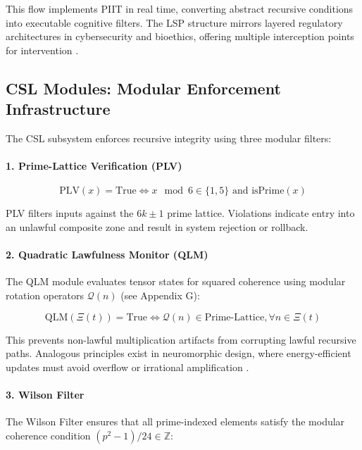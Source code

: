 \documentclass[12pt]{article}
\begin{document}
This flow implements PIIT in real time, converting abstract recursive conditions into executable cognitive filters. The LSP structure mirrors layered regulatory architectures in cybersecurity and bioethics, offering multiple interception points for intervention \cite{binns2018fairness}.

\subsection{CSL Modules: Modular Enforcement Infrastructure}

The CSL subsystem enforces recursive integrity using three modular filters:

\paragraph{1. Prime-Lattice Verification (PLV)}

\begin{equation}
\text{PLV}(x) = \text{True} \iff x \mod 6 \in \{1, 5\} \text{ and } \text{isPrime}(x)
\end{equation}

PLV filters inputs against the $6k \pm 1$ prime lattice. Violations indicate entry into an unlawful composite zone and result in system rejection or rollback.

\paragraph{2. Quadratic Lawfulness Monitor (QLM)}

The QLM module evaluates tensor states for squared coherence using modular rotation operators $\mathcal{Q}(n)$ (see Appendix G):

\begin{equation}
\text{QLM}(\Xi(t)) = \text{True} \iff \mathcal{Q}(n) \in \text{Prime-Lattice}, \forall n \in \Xi(t)
\end{equation}

This prevents non-lawful multiplication artifacts from corrupting lawful recursive paths. Analogous principles exist in neuromorphic design, where energy-efficient updates must avoid overflow or irrational amplification \cite{boahen2005neuromorphic}.

\paragraph{3. Wilson Filter}

The Wilson Filter ensures that all prime-indexed elements satisfy the modular coherence condition $(p^2 - 1)/24 \in \mathbb{Z}$:
\end{document}
